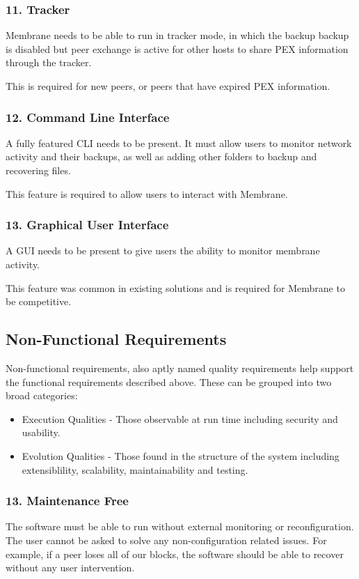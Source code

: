 \documentclass[a4paper, 11pt, twocolumn, twoside]{report}
\begin{document}
\subsubsection{11. Tracker}

Membrane needs to be able to run in tracker mode, in which the backup backup is disabled but peer exchange is active for other hosts to share PEX information through the tracker.

This is required for new peers, or peers that have expired PEX information.

\subsubsection{12. Command Line Interface}

A fully featured CLI needs to be present. It must allow users to monitor network activity and their backups, as well as adding other folders to backup and recovering files.

This feature is required to allow users to interact with Membrane.

\subsubsection{13. Graphical User Interface}

A GUI needs to be present to give users the ability to monitor membrane activity.

This feature was common in existing solutions and is required for Membrane to be competitive.

\subsection{Non-Functional Requirements}

Non-functional requirements, also aptly named quality requirements help support the functional requirements described above. These can be grouped into two broad categories:
\begin{itemize}
 \item Execution Qualities - Those observable at run time including security and usability.
 \item Evolution Qualities - Those found in the structure of the system including extensiblility, scalability, maintainability and testing.
\end{itemize}

\subsubsection{13. Maintenance Free}
The software must be able to run without external monitoring or reconfiguration. The user cannot be asked to solve any non-configuration related issues. For example, if a peer loses all of our blocks, the software should be able to recover without any user intervention.
\end{document}

